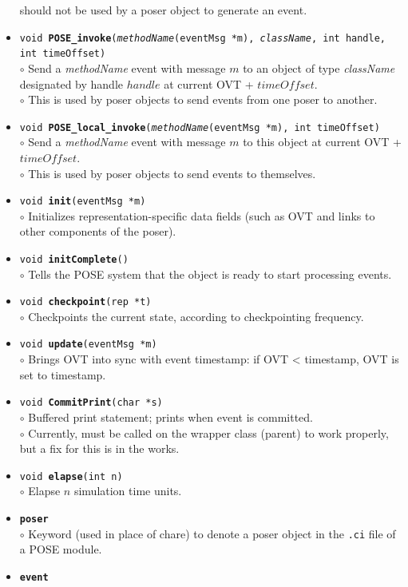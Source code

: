 \documentclass[10pt]{article}
\begin{document}
\begin{itemize}
	should not be used by a poser object to generate an event.
\item {\tt void {\bf POSE\_invoke}({\it methodName}(eventMsg *m),
{\it className}, int handle, int timeOffset)}\\
	$\circ$ Send a {\it methodName} event with message $m$ to an
	object of type {\it className} designated by handle $handle$
	at current OVT + $timeOffset$.\\
	$\circ$ This is used by poser objects to send events from one
	poser to another.
\item {\tt void {\bf POSE\_local\_invoke}({\it methodName}(eventMsg
	*m), int timeOffset)}\\
	$\circ$ Send a {\it methodName} event with message $m$ to this
	object at current OVT + $timeOffset$.\\
	$\circ$ This is used by poser objects to send events to themselves.
\item {\tt void {\bf init}(eventMsg *m)}\\
	$\circ$ Initializes representation-specific data fields (such
	as OVT and links to other components of the poser).
\item {\tt void {\bf initComplete}()}\\
	$\circ$ Tells the POSE system that the object is ready to
	start processing events.
\item {\tt void {\bf checkpoint}(rep *t)}\\
	$\circ$ Checkpoints the current state, according to
	checkpointing frequency.
\item {\tt void {\bf update}(eventMsg *m)}\\
	$\circ$ Brings OVT into sync with event timestamp: if OVT <
	timestamp, OVT is set to timestamp.
\item {\tt void {\bf CommitPrint}(char *s)}\\
	$\circ$ Buffered print statement; prints when event is
	committed.\\
	$\circ$ Currently, must be called on the wrapper class
	(parent) to work properly, but a fix for this is in the works.
\item {\tt void {\bf elapse}(int n)}\\
	$\circ$ Elapse $n$ simulation time units.
\item {\tt {\bf poser}}\\
	$\circ$ Keyword (used in place of chare) to denote a poser
	object in the {\tt .ci} file of a POSE module.
\item {\tt {\bf event}}\\

\end{itemize}
\end{document}
